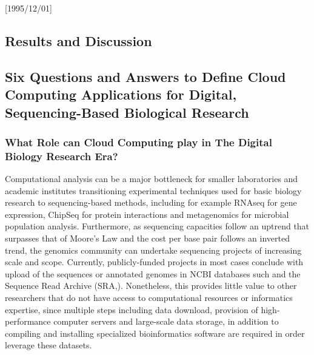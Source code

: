 \NeedsTeXFormat{LaTeX2e}[1995/12/01] \documentclass[10pt]{bmc_article}
\newenvironment{bmcformat}{\begin{raggedright}\baselineskip20pt\sloppy\setboolean{publ}{false}}{\end{raggedright}\baselineskip20pt\sloppy}
\begin{document}
\begin{bmcformat}

\section*{Results and Discussion}
\subsection*{Six Questions and Answers to Define Cloud Computing Applications for Digital, Sequencing-Based Biological Research} 

\subsubsection*{What Role can Cloud Computing play in The Digital Biology Research Era?}

Computational analysis can be a major bottleneck for smaller laboratories and academic institutes transitioning 
experimental techniques used for basic biology research to sequencing-based methods, including for example RNAseq 
for gene expression, ChipSeq for protein interactions and metagenomics for microbial population analysis. Furthermore, 
as sequencing capacities follow an uptrend that surpasses that of Moore's Law \cite{Meyer2006} and the cost per base pair 
follows an inverted trend, the genomics community can undertake sequencing projects of increasing scale and scope. 
Currently, publicly-funded projects in most cases conclude with upload of the sequences or annotated genomes
in NCBI \cite{ncbi} databases such and the Sequence  Read Archive (SRA,\cite{sra}). Nonetheless, this provides little value 
to  other researchers that do not have access to computational resources or informatics expertise, since multiple steps 
including data download, provision of high-performance computer servers and large-scale data storage, in addition to 
compiling and installing specialized bioinformatics software are required in order leverage these datasets.


\end{bmcformat}
\end{document}

